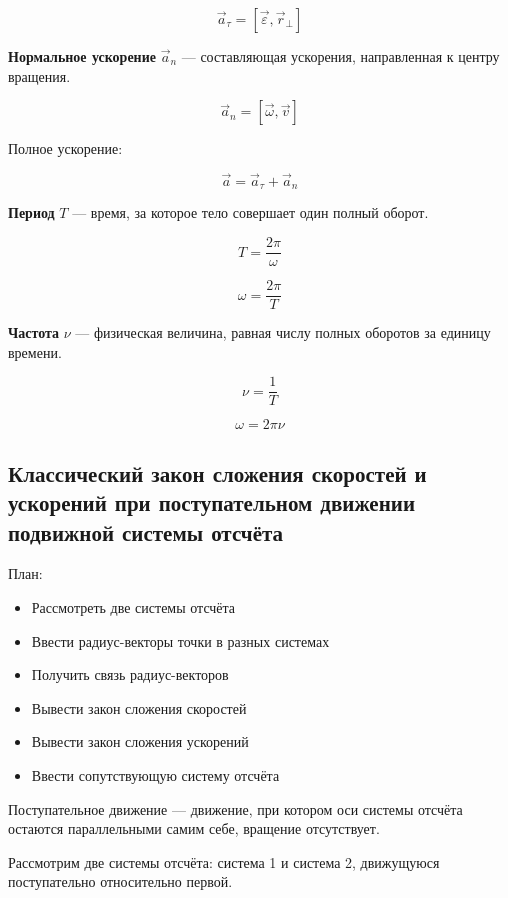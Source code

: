 \documentclass[a4paper,12pt]{article}
\begin{document}
\[
\vec a_\tau
=
[\vec \varepsilon, \vec r_\perp]
\]

\begin{definitionbox}
\textbf{Нормальное ускорение} $\vec a_n$ — составляющая ускорения, направленная к центру вращения.
\end{definitionbox}

\[
\vec a_n
=
[\vec \omega, \vec v]
\]

Полное ускорение:

\[
\vec a
=
\vec a_\tau
+
\vec a_n
\]

\begin{definitionbox}
    \textbf{Период} $T$ — время, за которое тело совершает один полный оборот.
\end{definitionbox}


\[
T
=
\frac{2\pi}{\omega}
\]

\[
\omega
=
\frac{2\pi}{T}
\]


\begin{definitionbox}
    \textbf{Частота} $\nu$ — физическая величина, равная числу полных оборотов за единицу времени.
\end{definitionbox}
\[
\nu
=
\frac{1}{T}
\]

\[
{\omega}
=
2\pi \nu
\]
 
\subsection{Классический закон сложения скоростей и ускорений при поступательном движении подвижной системы отсчёта}

План:
\begin{itemize}
\item Рассмотреть две системы отсчёта
\item Ввести радиус-векторы точки в разных системах
\item Получить связь радиус-векторов
\item Вывести закон сложения скоростей
\item Вывести закон сложения ускорений
\item Ввести сопутствующую систему отсчёта
\end{itemize}
 

\begin{definitionbox}
Поступательное движение — движение, при котором оси системы отсчёта остаются параллельными самим себе, вращение отсутствует.
\end{definitionbox}

Рассмотрим две системы отсчёта: система 1 и система 2, движущуюся поступательно относительно первой.
\end{document}
